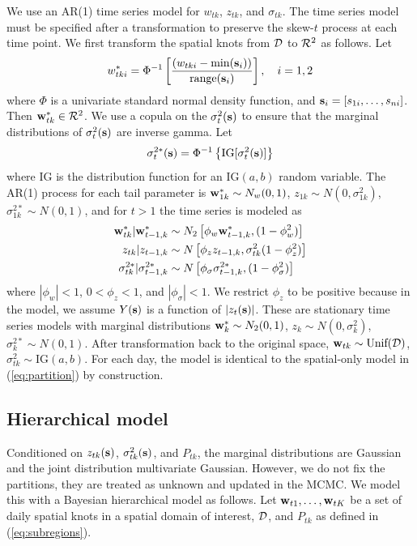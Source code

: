 \documentclass[11pt]{article}
\begin{document}
We use an AR(1) time series model for $w_{tk}$, $z_{tk}$, and $\sigma_{tk}$.
The time series model must be specified after a transformation to preserve the skew-$t$ process at each time point.
We first transform the spatial knots from ${\cal D}$ to ${\cal R}^2$ as follows.
Let
\begin{align}
  w^*_{tki} = \Phi^{-1}\left[ \frac{ (w_{tki} - \min(\mbox{\bf s}_i))}{ \text{range}(\mbox{\bf s}_i) } \right], \quad i = 1, 2
\end{align}
where $\Phi$ is a univariate standard normal density function, and $\mbox{\bf s}_i = [s_{1i}, \ldots, s_{ni}]$.
Then $\mbox{\bf w}^*_{tk} \in {\cal R}^2$.
We use a copula on the $\sigma^2_t(\mbox{\bf s})$ to ensure that the marginal distributions of $\sigma^2_t(\mbox{\bf s})$ are inverse gamma.
Let
\begin{align}
  \sigma^{2*}_t(\mbox{\bf s}) =\Phi^{-1}\left\{ \text{IG}[\sigma^2_t(\mbox{\bf s})] \right\}
\end{align}
where IG is the distribution function for an IG$(a, b)$ random variable.
The AR(1) process for each tail parameter is $\mbox{\bf w}^*_{1k} \sim N_w(0, 1)$, $z_{1k} \sim N(0, \sigma^2_{1k})$, $\sigma^{2*}_{1k} \sim N(0, 1)$, and for $t > 1$ the time series is modeled as
\begin{align}
  \mbox{\bf w}^*_{tk} | \mbox{\bf w}^*_{t-1, k} &\sim N_2\left[\phi_w \mbox{\bf w}^*_{t-1, k}, (1 - \phi_w^2) \right] \\
  z_{tk} | z_{t-1, k} &\sim N \left[\phi_z z_{t-1, k}, \sigma^2_{tk} (1 - \phi_z^2)\right] \\
  \sigma^{2*}_{tk} | \sigma^{2*}_{t-1, k} &\sim N \left[\phi_\sigma \sigma^{2*}_{t-1, k}, (1 - \phi_\sigma^2) \right]
\end{align}
where $|\phi_w| < 1$, $0 < \phi_z < 1$, and $|\phi_\sigma| < 1$.
We restrict $\phi_z$ to be positive because in the model, we assume $Y(\mbox{\bf s})$ is a function of $|z_t(\mbox{\bf s})|$.
These are stationary time series models with marginal distributions $\mbox{\bf w}^*_{k} \sim N_2(0, 1)$, $z_{k} \sim N(0, \sigma^2_{k})$, $\sigma^{2*}_{k} \sim N(0, 1)$.
After transformation back to the original space, $\mbox{\bf w}_{tk} \sim \text{Unif}({\cal D})$, $\sigma^2_{tk} \sim \text{IG}(a, b)$.
For each day, the model is identical to the spatial-only model in (\ref{eq:partition}) by construction.

\subsection{Hierarchical model}\label{s:hier}
Conditioned on $z_{tk}(\mbox{\bf s})$, $\sigma^2_{tk}(\mbox{\bf s})$, and $P_{tk}$, the marginal distributions are Gaussian and the joint distribution multivariate Gaussian.
However, we do not fix the partitions, they are treated as unknown and updated in the MCMC.
We model this with a Bayesian hierarchical model as follows.
Let $\mbox{\bf w}_{t1}, \ldots, \mbox{\bf w}_{tK}$ be a set of daily spatial knots in a spatial domain of interest, ${\cal D}$, and $P_{tk}$ as defined in (\ref{eq:subregions}).
\end{document}
